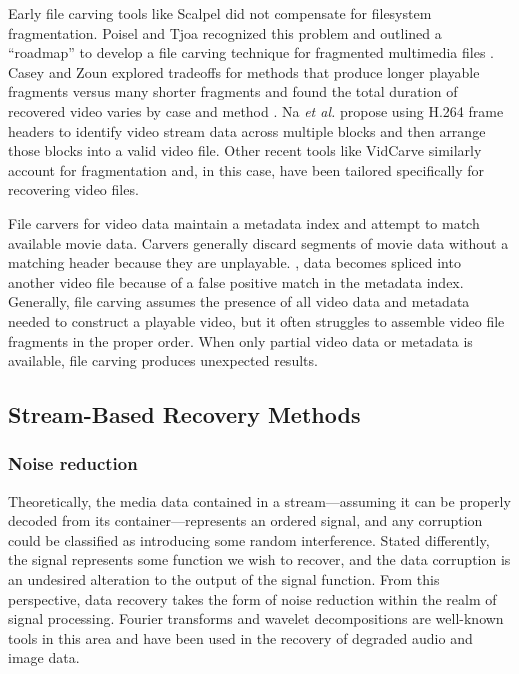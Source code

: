 Early file carving tools like Scalpel \cite{richard2005} did not compensate for filesystem fragmentation. Poisel and Tjoa recognized this problem and outlined a ``roadmap'' to develop a file carving technique for fragmented multimedia files \cite{poisel2011}. Casey and Zoun explored tradeoffs for methods that produce longer playable fragments versus many shorter fragments and found the total duration of recovered video varies by case and method \cite{casey2014}. Na \emph{et al.} \cite{na2014} propose using H.264 frame headers to identify video stream data across multiple blocks and then arrange those blocks into a valid video file. Other recent tools like VidCarve \cite{alghafli2016} similarly account for fragmentation and, in this case, have been tailored specifically for recovering video files.

File carvers for video data maintain a metadata index and attempt to match available movie data. Carvers generally discard segments of movie data without a matching header because they are unplayable.  , data becomes spliced into another video file because of a false positive match in the metadata index. Generally, file carving assumes the presence of all video data and metadata needed to construct a playable video, but it often struggles to assemble video file fragments in the proper order. When only partial video data or metadata is available, file carving produces unexpected results.

\subsection{Stream-Based Recovery Methods}

\subsubsection{Noise reduction}

Theoretically, the media data contained in a stream---assuming it can be properly decoded from its container---represents an ordered signal, and any corruption could be classified as introducing some random interference. Stated differently, the signal represents some function we wish to recover, and the data corruption is an undesired alteration to the output of the signal function. From this perspective, data recovery takes the form of noise reduction within the realm of signal processing. Fourier transforms and wavelet decompositions are well-known tools in this area and have been used in the recovery of degraded audio \cite{godsill1993} \cite{simon1993} and image \cite{weaver1991} \cite{john2020} data.

